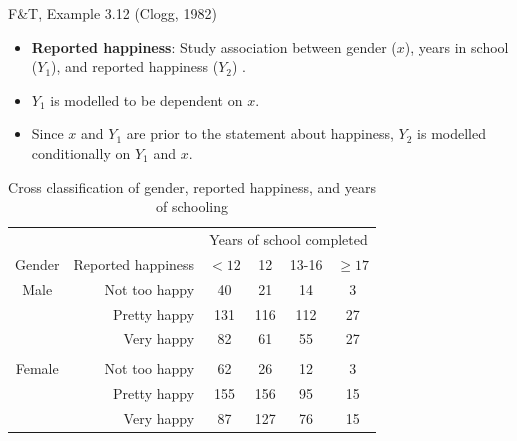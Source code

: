 \documentclass{beamer}
\begin{document}
\begin{frame}{F\&T, Example 3.12 (Clogg, 1982)}
\begin{itemize}
\item 
\textbf{Reported happiness}: Study
association between gender ($x$), years in school
($Y_1$), and reported happiness ($Y_2$) . 
\item $Y_1$ is  modelled to be dependent on  $x$. 
\ \
\item 
Since $x$ and $Y_1$  are prior to the statement about happiness, $Y_2$ is modelled conditionally on $Y_1$ and $x$.
\end{itemize}
\begin{table} [htbp]
\caption{Cross classification of gender, reported happiness, and years of schooling} \label{tab3.10}
\begin{center} {\small
\begin{tabular}{|crcccc|} \hline
&& \multicolumn{4}{c|}{Years of school completed} \\
Gender & Reported happiness & $<12$ & 12 & 13-16 & $\geq 17$ \\ \hline
Male & Not too happy & 40 & 21 & 14 & 3 \\
& Pretty happy & 131 & 116 & 112 & 27 \\
& Very happy & 82 & 61 & 55 & 27 \\
&&&&& \\
Female & Not too happy & 62 & 26 & 12 & 3 \\
& Pretty happy & 155 & 156 & 95 & 15 \\
& Very happy & 87 & 127 & 76 & 15 \\ \hline
\end{tabular}}
\end{center}
\end{table}
\end{frame}
\end{document}
